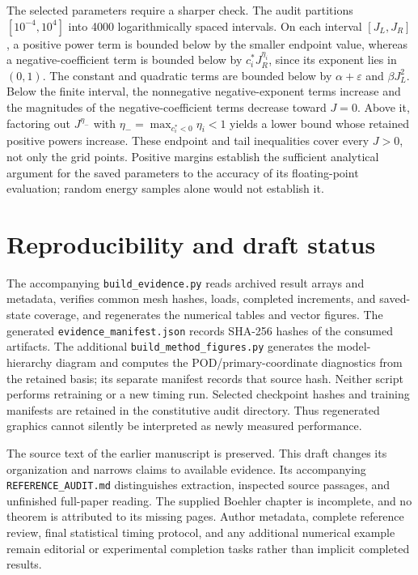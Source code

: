 The selected parameters require a sharper check. The audit partitions $[10^{-4},10^4]$ into 4000 logarithmically spaced intervals. On each interval $[J_L,J_R]$, a positive power term is bounded below by the smaller endpoint value, whereas a negative-coefficient term is bounded below by $c_i^*J_R^{\eta_i}$, since its exponent lies in $(0,1)$. The constant and quadratic terms are bounded below by $\alpha+\varepsilon$ and $\beta J_L^2$. Below the finite interval, the nonnegative negative-exponent terms increase and the magnitudes of the negative-coefficient terms decrease toward $J=0$. Above it, factoring out $J^{\eta_-}$ with $\eta_-=\max_{c_i^*<0}\eta_i<1$ yields a lower bound whose retained positive powers increase. These endpoint and tail inequalities cover every $J>0$, not only the grid points. Positive margins establish the sufficient analytical argument for the saved parameters to the accuracy of its floating-point evaluation; random energy samples alone would not establish it.

\section{Reproducibility and draft status}
The accompanying \texttt{build\_evidence.py} reads archived result arrays and metadata, verifies common mesh hashes, loads, completed increments, and saved-state coverage, and regenerates the numerical tables and vector figures. The generated \texttt{evidence\_manifest.json} records SHA-256 hashes of the consumed artifacts. The additional \texttt{build\_method\_figures.py} generates the model-hierarchy diagram and computes the POD/primary-coordinate diagnostics from the retained basis; its separate manifest records that source hash. Neither script performs retraining or a new timing run. Selected checkpoint hashes and training manifests are retained in the constitutive audit directory. Thus regenerated graphics cannot silently be interpreted as newly measured performance.

The source text of the earlier manuscript is preserved. This draft changes its organization and narrows claims to available evidence. Its accompanying \texttt{REFERENCE\_AUDIT.md} distinguishes extraction, inspected source passages, and unfinished full-paper reading. The supplied Boehler chapter is incomplete, and no theorem is attributed to its missing pages. Author metadata, complete reference review, final statistical timing protocol, and any additional numerical example remain editorial or experimental completion tasks rather than implicit completed results.
